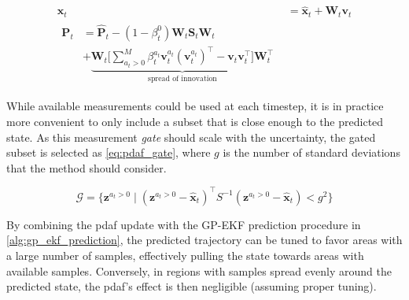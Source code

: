 \begin{subequations}
    \begin{align}
        \boldsymbol{x}_t & = \hat{\boldsymbol{x}}_t + \boldsymbol{W}_t \boldsymbol{v}_t \label{eq:pdaf_moment_mean} \\
        \begin{split}
            \boldsymbol{P}_t &= \hat{\boldsymbol{P}}_t - (1 - \beta_t^{0}) \boldsymbol{W}_t \boldsymbol{S}_t  \boldsymbol{W}_t\\ &+ \underbrace{\boldsymbol{W}_t \big[\sum_{a_t > 0}^M \beta_t^{a_t} \boldsymbol{v}_t^{a_t} (\boldsymbol{v}_t^{a_t})^\intercal - \boldsymbol{v}_t \boldsymbol{v}_t^\intercal \big] \boldsymbol{W}_t^\intercal}_{\text{spread of innovation}}\label{eq:pdaf_moment_var}
        \end{split}
    \end{align}
\end{subequations}

While available measurements could be used at each timestep, it is in practice more convenient to only include a subset that is close enough to the predicted state. As this measurement \textit{gate} should scale with the uncertainty, the gated subset is selected as \cref{eq:pdaf_gate}, where $g$ is the number of standard deviations that the method should consider.

\begin{equation} \label{eq:pdaf_gate}
    \mathcal{G} = \big\{ \boldsymbol{z}^{a_t > 0} \; | \; (\boldsymbol{z}^{a_t > 0} - \hat{\boldsymbol{x}}_t)^\intercal S^{-1} (\boldsymbol{z}^{a_t > 0} - \hat{\boldsymbol{x}}_t) < g^2 \big\}
\end{equation}


By combining the \acrshort{pdaf} update with the GP-EKF prediction procedure in \cref{alg:gp_ekf_prediction}, the predicted trajectory can be tuned to favor areas with a large number of samples, effectively pulling the state towards areas with available samples. Conversely, in regions with samples spread evenly around the predicted state, the \acrshort{pdaf}'s effect is then negligible (assuming proper tuning).

